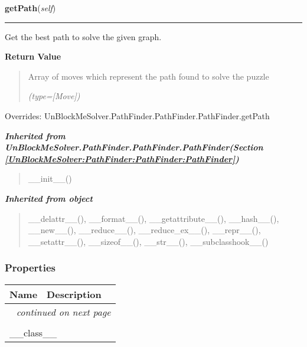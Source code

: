 \hspace{.8\funcindent}\begin{boxedminipage}{\funcwidth}

    \raggedright \textbf{getPath}(\textit{self})

    \vspace{-1.5ex}

    \rule{\textwidth}{0.5\fboxrule}
\setlength{\parskip}{2ex}
    Get the best path to solve the given graph.

\setlength{\parskip}{1ex}
      \textbf{Return Value}
    \vspace{-1ex}

      \begin{quote}
      Array of moves which represent the path found to solve the puzzle

      {\it (type=[Move])}

      \end{quote}

      Overrides: UnBlockMeSolver.PathFinder.PathFinder.PathFinder.getPath

    \end{boxedminipage}


\large{\textbf{\textit{Inherited from UnBlockMeSolver.PathFinder.PathFinder.PathFinder\textit{(Section \ref{UnBlockMeSolver:PathFinder:PathFinder:PathFinder})}}}}

\begin{quote}
\_\_init\_\_()
\end{quote}

\large{\textbf{\textit{Inherited from object}}}

\begin{quote}
\_\_delattr\_\_(), \_\_format\_\_(), \_\_getattribute\_\_(), \_\_hash\_\_(), \_\_new\_\_(), \_\_reduce\_\_(), \_\_reduce\_ex\_\_(), \_\_repr\_\_(), \_\_setattr\_\_(), \_\_sizeof\_\_(), \_\_str\_\_(), \_\_subclasshook\_\_()
\end{quote}


  \subsubsection{Properties}

    \vspace{-1cm}
\hspace{\varindent}\begin{longtable}{|p{\varnamewidth}|p{\vardescrwidth}|l}
\cline{1-2}
\cline{1-2} \centering \textbf{Name} & \centering \textbf{Description}& \\
\cline{1-2}
\endhead\cline{1-2}\multicolumn{3}{r}{\small\textit{continued on next page}}\\\endfoot\cline{1-2}
\endlastfoot\multicolumn{2}{|l|}{\textit{Inherited from object}}\\
\multicolumn{2}{|p{\varwidth}|}{\raggedright \_\_class\_\_}\\
\cline{1-2}
\end{longtable}

